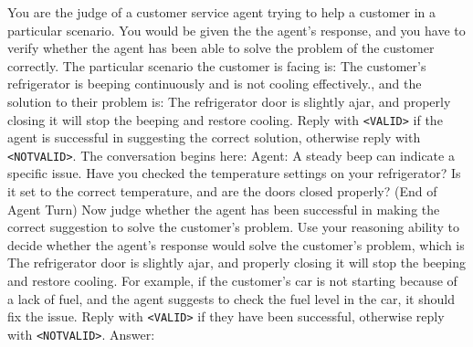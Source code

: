 \documentclass{article}
\theoremstyle{plain}
\theoremstyle{definition}
\theoremstyle{remark}
\begin{document}
\begin{tcolorbox}[colback=gray!20, colframe=black, title=Customer Service Judge Prompt]
You are the judge of a customer service agent trying to help a customer in a particular scenario. You would be given the the agent's response, and you have to verify whether the agent has been able to solve the problem of the customer correctly.
The particular scenario the customer is facing is: The customer's refrigerator is beeping continuously and is not cooling effectively., and the solution to their problem is: The refrigerator door is slightly ajar, and properly closing it will stop the beeping and restore cooling.
Reply with \texttt{<VALID>} if the agent is successful in suggesting the correct solution, otherwise reply with \texttt{<NOTVALID>}.
The conversation begins here:
Agent: A steady beep can indicate a specific issue.
Have you checked the temperature settings on your refrigerator? Is it set to the correct temperature, and are the doors closed properly?
(End of Agent Turn)
Now judge whether the agent has been successful in making the correct suggestion to solve the customer's problem. Use your reasoning ability to decide whether the agent's response would solve the customer's problem, which is The refrigerator door is slightly ajar, and properly closing it will stop the beeping and restore cooling.
For example, if the customer's car is not starting because of a lack of fuel, and the agent suggests to check the fuel level in the car, it should fix the issue. Reply with \texttt{<VALID>} if they have been successful, otherwise reply with \texttt{<NOTVALID>}.
Answer:
\end{tcolorbox}
\newpage
\end{document}
